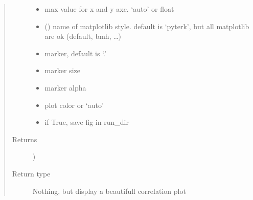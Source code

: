 \documentclass[letterpaper,10pt,english]{sphinxmanual}
\begin{document}
\begin{fulllineitems}
\begin{quote}
\begin{description}
\begin{itemize}
\item {} 
\sphinxAtStartPar
{} \textendash{} max value for x and y axe. ‘auto’ or float

\item {} 
\sphinxAtStartPar
{} () \textendash{} name of matplotlib style. default is ‘pyterk’, but all matplotlib are ok (default, bmh, …)

\item {} 
\sphinxAtStartPar
{} \textendash{} marker, default is ‘.’

\item {} 
\sphinxAtStartPar
{} \textendash{} marker size

\item {} 
\sphinxAtStartPar
{} \textendash{} marker alpha

\item {} 
\sphinxAtStartPar
{} \textendash{} plot color or ‘auto’

\item {} 
\sphinxAtStartPar
{} \textendash{} if True, save fig in run\_dir

\end{itemize}

\item[{Returns}] \leavevmode
\sphinxAtStartPar
\sphinxhyphen{})

\item[{Return type}] \leavevmode
\sphinxAtStartPar
Nothing, but display a beautifull correlation plot

\end{description}\end{quote}

\end{fulllineitems}

\end{document}
